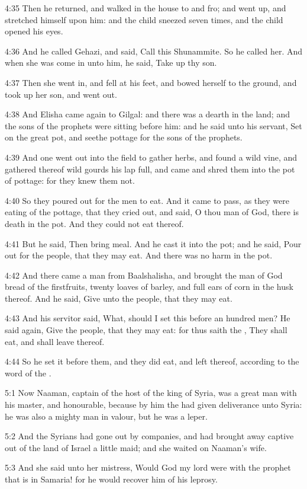 4:35 Then he returned, and walked in the house to and fro; and went
up, and stretched himself upon him: and the child sneezed seven times,
and the child opened his eyes.

4:36 And he called Gehazi, and said, Call this Shunammite. So he
called her. And when she was come in unto him, he said, Take up thy
son.

4:37 Then she went in, and fell at his feet, and bowed herself to the
ground, and took up her son, and went out.

4:38 And Elisha came again to Gilgal: and there was a dearth in the
land; and the sons of the prophets were sitting before him: and he
said unto his servant, Set on the great pot, and seethe pottage for
the sons of the prophets.

4:39 And one went out into the field to gather herbs, and found a wild
vine, and gathered thereof wild gourds his lap full, and came and
shred them into the pot of pottage: for they knew them not.

4:40 So they poured out for the men to eat. And it came to pass, as
they were eating of the pottage, that they cried out, and said, O thou
man of God, there is death in the pot. And they could not eat thereof.

4:41 But he said, Then bring meal. And he cast it into the pot; and he
said, Pour out for the people, that they may eat. And there was no
harm in the pot.

4:42 And there came a man from Baalshalisha, and brought the man of
God bread of the firstfruits, twenty loaves of barley, and full ears
of corn in the husk thereof. And he said, Give unto the people, that
they may eat.

4:43 And his servitor said, What, should I set this before an hundred
men?  He said again, Give the people, that they may eat: for thus
saith the \LORD, They shall eat, and shall leave thereof.

4:44 So he set it before them, and they did eat, and left thereof,
according to the word of the \LORD.

5:1 Now Naaman, captain of the host of the king of Syria, was a great
man with his master, and honourable, because by him the \LORD had given
deliverance unto Syria: he was also a mighty man in valour, but he was
a leper.

5:2 And the Syrians had gone out by companies, and had brought away
captive out of the land of Israel a little maid; and she waited on
Naaman's wife.

5:3 And she said unto her mistress, Would God my lord were with the
prophet that is in Samaria! for he would recover him of his leprosy.


